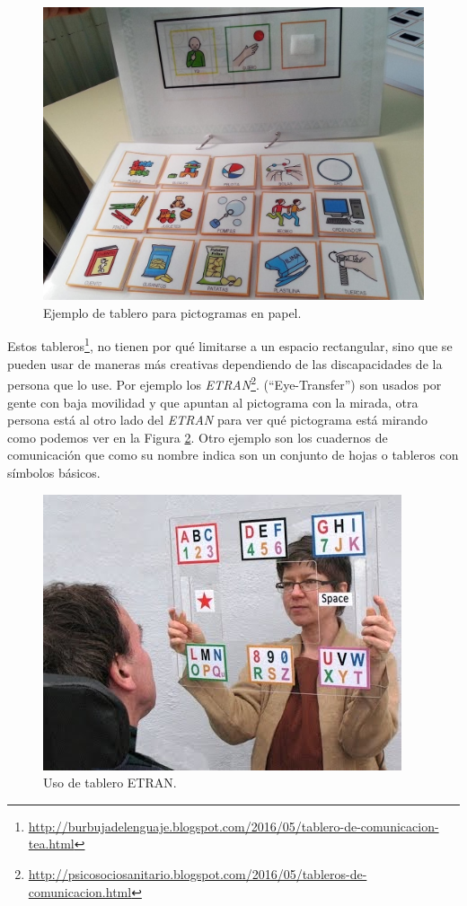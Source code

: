 \begin{figure}[h!]
	\centering
	\includegraphics[width=0.7\linewidth]{Imagenes/Bitmap/EditoresPictogramas}
	\caption{Ejemplo de tablero para pictogramas en papel.}
	\label{fig:editorespictogramas}
\end{figure}

Estos tableros\footnote{\url{http://burbujadelenguaje.blogspot.com/2016/05/tablero-de-comunicacion-tea.html}}, no tienen por qué limitarse a un espacio rectangular, sino que se pueden usar de maneras más creativas dependiendo de las discapacidades de la persona que lo use. Por ejemplo los \textit{ETRAN}\footnote{\url{http://psicosociosanitario.blogspot.com/2016/05/tableros-de-comunicacion.html}}. (“Eye-Transfer”) son usados por gente con baja movilidad y que apuntan al pictograma con la mirada, otra persona está al otro lado del \textit{ETRAN} para ver qué pictograma está mirando como podemos ver en la Figura \ref{fig:tablero}. Otro ejemplo son los cuadernos de comunicación que como su nombre indica son un conjunto de hojas o tableros con símbolos básicos.

\begin{figure}[h!]
	\centering
	\includegraphics[width=0.7\linewidth]{Imagenes/Bitmap/Tablero}
	\caption{Uso de tablero ETRAN.}
	\label{fig:tablero}
\end{figure}

